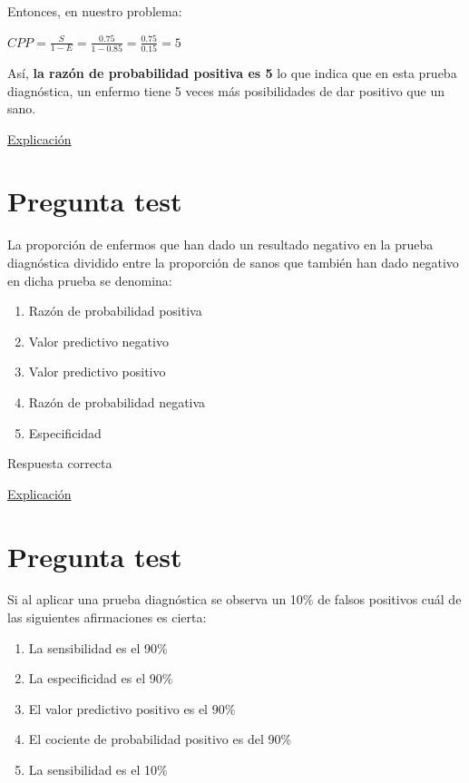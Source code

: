 \documentclass[
]{book}
\providecommand{\tightlist}{%
  \setlength{\itemsep}{0pt}\setlength{\parskip}{0pt}}
\begin{document}
Entonces, en nuestro problema:

\(CPP= \frac{S}{1-E}= \frac{0.75}{1-0.85}=\frac{0.75}{0.15}=5\)

Así, \textbf{la razón de probabilidad positiva es 5} lo que indica que en esta prueba diagnóstica, un enfermo tiene 5 veces más posibilidades de dar positivo que un sano.

\href{https://www.elsevier.es/es-revista-revista-argentina-radiologia-383-articulo-likelihood-ratio-razon-verosimilitud-definicion-S0048761916301910}{Explicación}

\hypertarget{pregunta-test-160}{%
\section{Pregunta test}\label{pregunta-test-160}}

La proporción de enfermos que han dado un resultado negativo en la prueba diagnóstica dividido entre la proporción de sanos que también han dado negativo en dicha prueba se denomina:

\begin{enumerate}
\def\labelenumi{\alph{enumi})}
\tightlist
\item
  Razón de probabilidad positiva
\item
  Valor predictivo negativo
\item
  Valor predictivo positivo
\item
  Razón de probabilidad negativa
\item
  Especificidad
\end{enumerate}

Respuesta correcta

\href{https://www.redalyc.org/journal/3555/355568264003/html/}{Explicación}

\hypertarget{pregunta-test-161}{%
\section{Pregunta test}\label{pregunta-test-161}}

Si al aplicar una prueba diagnóstica se observa un 10\% de falsos positivos cuál de las siguientes afirmaciones es cierta:

\begin{enumerate}
\def\labelenumi{\alph{enumi})}
\tightlist
\item
  La sensibilidad es el 90\%
\item
  La especificidad es el 90\%
\item
  El valor predictivo positivo es el 90\%
\item
  El cociente de probabilidad positivo es del 90\%
\item
  La sensibilidad es el 10\%
\end{enumerate}
\end{document}
